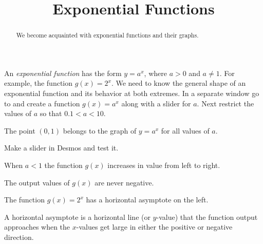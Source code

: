\documentclass{ximera}
\title{Exponential Functions}
\begin{document}
\begin{abstract}
We become acquainted with exponential functions and their graphs.
\end{abstract}
\maketitle


An \emph{exponential function} has the form $y=a^x$, where $a>0$ and $a\ne1$. For example, the function $g(x)=2^x$. We need to know the general shape of an exponential function and its behavior at both extremes. In a separate window go to  and create a function $g(x)=a^x$ along with a slider for $a$. Next restrict the values of $a$ so that $0.1<a<10$.

\begin{question}
The point $(0,1)$ belongs to the graph of $y=a^x$ for all values of $a$.
\begin{hint}
Make a slider in Desmos and test it.
\end{hint}
    \begin{multipleChoice}
    \end{multipleChoice}
\end{question}

\begin{question}
When $a<1$ the function $g(x)$ increases in value from left to right.
    \begin{multipleChoice}
    \end{multipleChoice}
\end{question}

\begin{question}
The output values of $g(x)$ are never negative.
    \begin{multipleChoice}
    \end{multipleChoice}
\end{question}

\begin{question}
The function $g(x)=2^x$ has a horizontal asymptote on the left.
\begin{hint}
A horizontal asymptote is a horizontal line (or $y$-value) that the function output approaches when the $x$-values get large in either the positive or negative direction.
\end{hint}
    \begin{multipleChoice}
    \end{multipleChoice}
\end{question}
\end{document}
